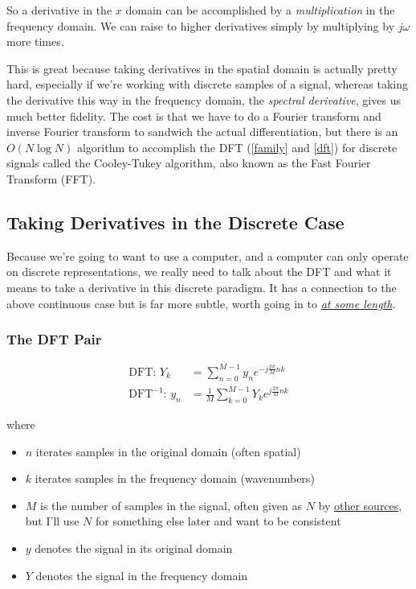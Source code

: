 \documentclass[10pt]{article}
\begin{document}
So a derivative in the $x$ domain can be accomplished by a \textit{multiplication} in the frequency domain. We can raise to higher derivatives simply by multiplying by $j \omega$ more times.

This is great because taking derivatives in the spatial domain is actually pretty hard, especially if we're working with discrete samples of a signal, whereas taking the derivative this way in the frequency domain, the \textit{spectral derivative}, gives us much better fidelity.\cite{trefethen4}\cite{kutz} The cost is that we have to do a Fourier transform and inverse Fourier transform to sandwich the actual differentiation, but there is an $O(N \log N)$ algorithm to accomplish the DFT (\autoref{family} and \autoref{dft}) for discrete signals called the Cooley-Tukey algorithm, also known as the Fast Fourier Transform (FFT)\cite{kutz}.

\subsection{Taking Derivatives in the Discrete Case}

Because we're going to want to use a computer, and a computer can only operate on discrete representations, we really need to talk about the DFT and what it means to take a derivative in this discrete paradigm. It has a connection to the above continuous case but is far more subtle, worth going in to \textit{\href{https://www.youtube.com/watch?v=v7l3Q11DBq0&t=1299s}{at some length}}.

\subsubsection{The DFT Pair}

\begin{equation}\label{dft}
\begin{aligned}
\text{DFT: \ \ } Y_k &= \sum_{n=0}^{M-1} y_n e^{-j \frac{2\pi}{M} n k} \\
\text{DFT} ^{-1} \text{: \ \ } y_n &= \frac{1}{M} \sum_{k=0}^{M-1} Y_k e^{j \frac{2\pi}{M} n k}
\end{aligned}
\end{equation}

where
\begin{itemize}[noitemsep, topsep=0pt, after=\newline]
	\item $n$ iterates samples in the original domain (often spatial)
	\item $k$ iterates samples in the frequency domain (wavenumbers)
	\item $M$ is the number of samples in the signal, often given as $N$ by \href{https://numpy.org/doc/2.1/reference/routines.fft.html}{other sources}\cite{numpy}, but I'll use $N$ for something else later and want to be consistent
	\item $y$ denotes the signal in its original domain
	\item $Y$ denotes the signal in the frequency domain
\end{itemize}
\end{document}
